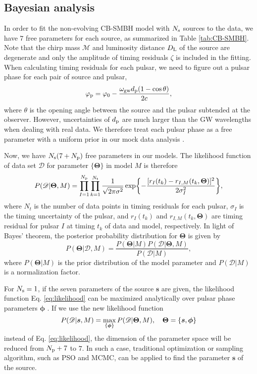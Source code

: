\documentclass[times,tight]{aastex631}
\begin{document}
\subsection{Bayesian analysis}
In order to fit the non-evolving CB-SMBH model with $N_{\rm s}$ sources to the data, we have $7$ free parameters for each source, as summarized in Table \ref{tab:CB-SMBH}.
Note that the chirp mass $\mathcal{M}$ and luminosity distance $D_{\rm L}$ of the source are degenerate and only the amplitude of timing residuals $\zeta$ is included in the fitting.
When calculating timing residuals for each pulsar, we need to figure out a pulsar phase for each pair of source and pulsar,
\begin{equation}
    \varphi_{\rm p} = \varphi_0 - \frac{\omega_{\rm gw} d_{\rm p} (1 - \cos\theta)}{2c}, 
\end{equation}
where $\theta$ is the opening angle between the source and the pulsar subtended at the observer.
However, uncertainties of $d_{\rm p}$ are much larger than the GW wavelengths when dealing with real data.
We therefore treat each pulsar phase as a free parameter with a uniform prior in our mock data analysis \citep{corbin2010}.

Now, we have $N_{\rm s} (7 + N_{\rm p})$ free parameters in our models.
The likelihood function of data set $\mathscr{D}$ for parameter $\{\bm{\Theta}\}$ in model $M$ is therefore
\begin{equation}\label{eq:likelihood}
    P(\mathscr{D}|\bm{\Theta},M) = \prod_{I=1}^{N_{\rm p}} \prod_{k=1}^{N_{\rm t}} \frac{1}{\sqrt{2\pi \sigma^2}} \exp{-\frac{[r_I(t_k) - r_{I,M}(t_k,\bm{\Theta})]^2}{2\sigma_I^2}},
\end{equation}
where $N_t$ is the number of data points in timing residuals for each pulsar, $\sigma_I$ is the timing uncertainty of the pulsar, and $r_I(t_k)$ and $r_{I,M}(t_k,\bm{\Theta})$ are timing residual for pulsar $I$ at timing $t_k$ of  data and model, respectively.
In light of Bayes' theorem, the posterior probability distribution for $\bm{\Theta}$ is given by
\begin{equation}\label{eq:posterior}
    P(\bm{\Theta} | \mathscr{D},M) = \frac{P(\bm{\Theta}|M) P(\mathscr{D} | \bm{\Theta},M)}{P(\mathscr{D}|M)},
\end{equation}
where $P(\bm{\Theta}|M)$ is the prior distribution of the model parameter and $P(\mathscr{D}|M)$ is a normalization factor.

For $N_{\rm s} = 1$, if the seven parameters of the source $\bm{s}$ are given, the likelihood function Eq. \ref{eq:likelihood} can be maximized analytically over pulsar phase parameters $\bm{\phi}$ \citep{wang2015}. If we use the new likelihood function
\begin{equation}
    P(\mathscr{D}|\bm{s},M) = \max_{\{\bm{\phi}\}}P(\mathscr{D}|\bm{\Theta},M) \qc \bm{\Theta} = \{\bm{s}, \bm{\phi}\}
\end{equation}
instead of Eq. \ref{eq:likelihood}, the dimension of the parameter space will be reduced from $N_{\rm p} + 7$ to $7$.
In such a case, traditional optimization or sampling algorithm, such as PSO and MCMC, can be applied to find the parameter $\bm{s}$ of the source.
\end{document}
